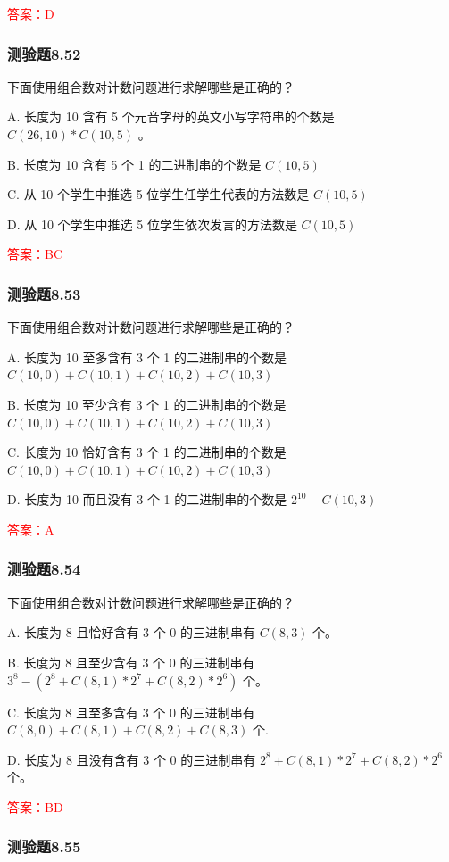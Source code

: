 \documentclass[UTF8, heading=true]{ctexart}
\begin{document}
\textcolor{red}{答案：D}

\subsubsection{测验题8.52}
下面使用组合数对计数问题进行求解哪些是正确的？

A. 长度为 10 含有 5 个元音字母的英文小写字符串的个数是 $C(26,10) * C(10,5)$ 。

B. 长度为 10 含有 5 个 1 的二进制串的个数是 $C(10,5)$

C. 从 10 个学生中推选 5 位学生任学生代表的方法数是 $C(10,5)$

D. 从 10 个学生中推选 5 位学生依次发言的方法数是 $C(10,5)$

\textcolor{red}{答案：BC}

\subsubsection{测验题8.53}

下面使用组合数对计数问题进行求解哪些是正确的？

A. 长度为 10 至多含有 3 个 1 的二进制串的个数是 $C(10,0)+C(10,1)+C(10,2)+C(10,3)$

B. 长度为 10 至少含有 3 个 1 的二进制串的个数是 $C(10,0)+C(10,1)+C(10,2)+C(10,3)$

C. 长度为 10 恰好含有 3 个 1 的二进制串的个数是 $C(10,0)+C(10,1)+C(10,2)+C(10,3)$

D. 长度为 10 而且没有 3 个 1 的二进制串的个数是 $2^{10}-C(10,3)$

\textcolor{red}{答案：A}

\subsubsection{测验题8.54}
下面使用组合数对计数问题进行求解哪些是正确的？

A. 长度为 8 且恰好含有 3 个 0 的三进制串有 $C(8,3)$ 个。

B. 长度为 8 且至少含有 3 个 0 的三进制串有 $3^8-\left(2^8+C(8,1) * 2^7+C(8,2) * 2^6\right)$ 个。

C. 长度为 8 且至多含有 3 个 0 的三进制串有 $C(8,0)+C(8,1)+C(8,2)+C(8,3)$ 个.

D. 长度为 8 且没有含有 3 个 0 的三进制串有 $2^8+C(8,1) * 2^7+C(8,2) * 2^6$ 个。

\textcolor{red}{答案：BD}

\subsubsection{测验题8.55}
\end{document}
